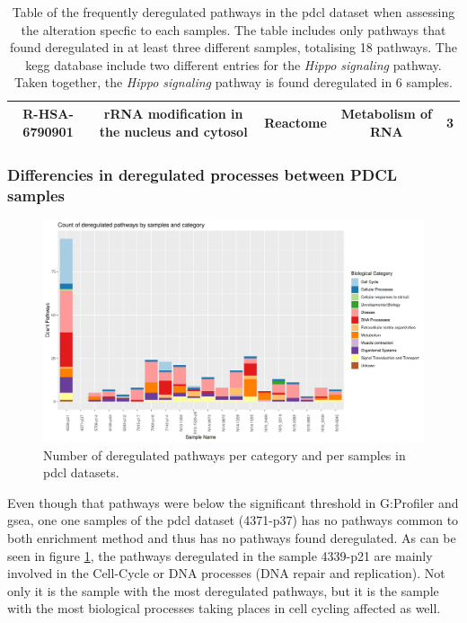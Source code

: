 \begin{table}
{\begin{tabular}{ |c|c|c|c|c| }
            R-HSA-6790901 & rRNA modification in the nucleus and cytosol & Reactome & Metabolism of RNA & 3 \\
            \hline
        \end{tabular}
    }
    \caption{
        Table of the frequently deregulated pathways in the \acrshort{pdcl} dataset when assessing the alteration specfic to each samples.
        The table includes only pathways that found deregulated in at least three different samples, totalising 18 pathways.
        The \acrshort{kegg} database include two different entries for the \textit{Hippo signaling} pathway.
        Taken together, the \textit{Hippo signaling} pathway is found deregulated in 6 samples.
    }
    \label{table:frequently-dereg-pathways}
\end{table}

\subsubsection{Differencies in deregulated processes between PDCL samples}

\begin{figure}
    \includegraphics[width=\textwidth]{img/barplot-categ-pdcl}
    \caption{
        Number of deregulated pathways per category and per samples in \acrshort{pdcl} datasets.
    }
    \label{fig:barplot-categ-pdcl}
\end{figure}

Even though that pathways were below the significant threshold in G:Profiler and \acrshort{gsea}, one one samples of the \acrshort{pdcl} dataset (4371-p37) has no pathways common to both enrichment method and thus has no pathways found deregulated.
As can be seen in figure \ref*{fig:barplot-categ-pdcl}, the pathways deregulated in the sample 4339-p21 are mainly involved in the Cell-Cycle or DNA processes (DNA repair and replication).
Not only it is the sample with the most deregulated pathways, but it is the sample with the most biological processes taking places in cell cycling affected as well.

